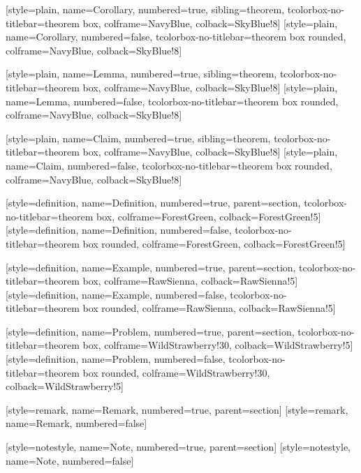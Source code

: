 [style=plain, name=Corollary, numbered=true, sibling=theorem,
    tcolorbox-no-titlebar={theorem box, colframe=NavyBlue, colback=SkyBlue!8}]
[style=plain, name=Corollary, numbered=false,
    tcolorbox-no-titlebar={theorem box rounded, colframe=NavyBlue, colback=SkyBlue!8}]

[style=plain, name=Lemma, numbered=true, sibling=theorem,
    tcolorbox-no-titlebar={theorem box, colframe=NavyBlue, colback=SkyBlue!8}]
[style=plain, name=Lemma, numbered=false,
    tcolorbox-no-titlebar={theorem box rounded, colframe=NavyBlue, colback=SkyBlue!8}]

[style=plain, name=Claim, numbered=true, sibling=theorem,
    tcolorbox-no-titlebar={theorem box, colframe=NavyBlue, colback=SkyBlue!8}]
[style=plain, name=Claim, numbered=false,
    tcolorbox-no-titlebar={theorem box rounded, colframe=NavyBlue, colback=SkyBlue!8}]

[style=definition, name=Definition, numbered=true, parent=section,
    tcolorbox-no-titlebar={theorem box, colframe=ForestGreen, colback=ForestGreen!5}]
[style=definition, name=Definition, numbered=false,
    tcolorbox-no-titlebar={theorem box rounded, colframe=ForestGreen, colback=ForestGreen!5}]

[style=definition, name=Example, numbered=true, parent=section,
    tcolorbox-no-titlebar={theorem box, colframe=RawSienna, colback=RawSienna!5}]
[style=definition, name=Example, numbered=false,
    tcolorbox-no-titlebar={theorem box rounded, colframe=RawSienna, colback=RawSienna!5}]

[style=definition, name=Problem, numbered=true, parent=section,
    tcolorbox-no-titlebar={theorem box, colframe=WildStrawberry!30, colback=WildStrawberry!5}]
[style=definition, name=Problem, numbered=false,
    tcolorbox-no-titlebar={theorem box rounded, colframe=WildStrawberry!30, colback=WildStrawberry!5}]

[style=remark, name=Remark, numbered=true, parent=section]
[style=remark, name=Remark, numbered=false]


[style=notestyle, name=Note, numbered=true, parent=section]
[style=notestyle, name=Note, numbered=false]

